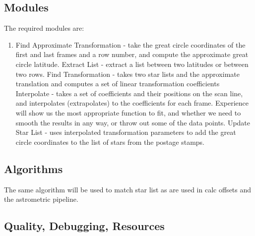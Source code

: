 \subsection{Modules}
The required modules are:
\begin{enumerate}
\item Find Approximate Transformation - take the great circle coordinates
of the first and last frames and a row number, and compute the
approximate great circle latitude.
\sitem Extract List - extract a list between two latitudes or between
two rows.
\sitem Find Transformation - takes two star lists and the approximate
translation and computes a set of linear transformation coefficients
\sitem Interpolate - takes a set of coefficients and their positions on
the scan line, and interpolates (extrapolates) to the coefficients for
each frame.  Experience will show us the most appropriate function to
fit, and whether we need to smooth the results in any way, or throw out
some of the data points.
\sitem Update Star List - uses interpolated transformation parameters
to add the great circle coordinates to the list of stars from the postage
stamps.
\end{enumerate}
\subsection{Algorithms}
The same algorithm will be used to match star list as are used in calc
offsets and the astrometric pipeline.
\subsection{Quality, Debugging, Resources}
